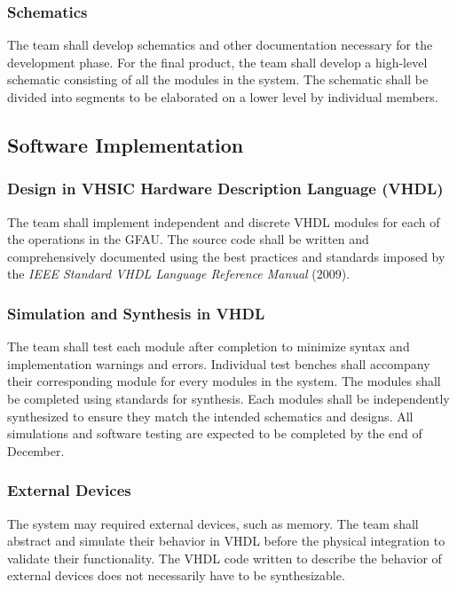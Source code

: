 \documentclass[12pt]{extarticle}
\begin{document}
            \subsubsection{Schematics} The team shall develop 
            schematics and other documentation necessary for the development
            phase. For the final product, the team shall develop a high-level
            schematic consisting of all the modules in the system. The
            schematic shall be divided into segments to be elaborated on a
            lower level by individual members.

        \subsection{Software Implementation}

            \subsubsection{Design in VHSIC Hardware Description Language
            (VHDL)} The team shall implement independent and discrete VHDL
            modules for each of the operations in the GFAU. The source
            code shall be written and comprehensively documented using the best
            practices and standards imposed by the \textit{IEEE Standard VHDL
            Language Reference Manual} (2009).

            \subsubsection{Simulation and Synthesis in VHDL} The team shall
            test each module after completion to minimize syntax and
            implementation warnings and errors. Individual test benches shall
            accompany their corresponding module for every modules in the
            system. The modules shall be completed using standards for
            synthesis. Each modules shall be independently synthesized to
            ensure they match the intended schematics and designs. All
            simulations and software testing are expected to be completed by
            the end of December.

            \subsubsection{External Devices} The system may required external
            devices, such as memory. The team shall abstract and simulate their
            behavior in VHDL before the physical integration to validate their
            functionality. The VHDL code written to describe the behavior of
            external devices does not necessarily have to be synthesizable.
\end{document}
